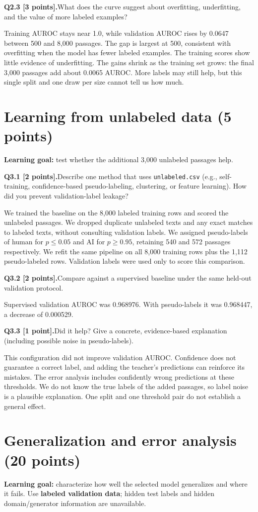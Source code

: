 \documentclass[11pt,letterpaper]{article}
\newcommand{\question}[2]{\needspace{4\baselineskip}\par\addvspace{0.45em}\noindent\textbf{#1}\quad #2\par\nobreak\vspace{0.1em}}
\begin{document}
\question{Q2.3 [3 points].}{What does the curve suggest about overfitting, underfitting, and the value of more labeled examples?}
Training AUROC stays near 1.0, while validation AUROC rises by 0.0647 between 500 and 8,000 passages. The gap is largest at 500, consistent with overfitting when the model has fewer labeled examples. The training scores show little evidence of underfitting. The gains shrink as the training set grows: the final 3,000 passages add about 0.0065 AUROC. More labels may still help, but this single split and one draw per size cannot tell us how much.

\section{Learning from unlabeled data (5 points)}
\textbf{Learning goal:} test whether the additional 3,000 unlabeled passages help.
\question{Q3.1 [2 points].}{Describe one method that uses \texttt{unlabeled.csv} (e.g., self-training, confidence-based pseudo-labeling, clustering, or feature learning). How did you prevent validation-label leakage?}
We trained the baseline on the 8,000 labeled training rows and scored the unlabeled passages. We dropped duplicate unlabeled texts and any exact matches to labeled texts, without consulting validation labels. We assigned pseudo-labels of human for $p\leq0.05$ and AI for $p\geq0.95$, retaining 540 and 572 passages respectively. We refit the same pipeline on all 8,000 training rows plus the 1,112 pseudo-labeled rows. Validation labels were used only to score this comparison.

\question{Q3.2 [2 points].}{Compare against a supervised baseline under the same held-out validation protocol.}
Supervised validation AUROC was 0.968976. With pseudo-labels it was 0.968447, a decrease of 0.000529.

\question{Q3.3 [1 point].}{Did it help? Give a concrete, evidence-based explanation (including possible noise in pseudo-labels).}
This configuration did not improve validation AUROC. Confidence does not guarantee a correct label, and adding the teacher's predictions can reinforce its mistakes. The error analysis includes confidently wrong predictions at these thresholds. We do not know the true labels of the added passages, so label noise is a plausible explanation. One split and one threshold pair do not establish a general effect.

\newpage
\section{Generalization and error analysis (20 points)}
\textbf{Learning goal:} characterize how well the selected model generalizes and where it fails. Use \textbf{labeled validation data}; hidden test labels and hidden domain/generator information are unavailable.
\end{document}

